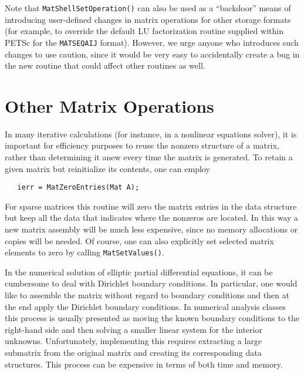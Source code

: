 Note that {\tt MatShellSetOperation()} can also be used as a
``backdoor'' means of introducing user-defined changes in matrix
operations for other storage formats (for example, to override the
default LU factorization routine supplied within PETSc for the
{\tt MATSEQAIJ} format).  However, we urge anyone who introduces such
changes to use caution, since it would be very easy to
accidentally create a bug in the new routine that could affect
other routines as well.

\section{Other Matrix Operations}
\label{sec:othermat}

In many iterative calculations (for instance, in a nonlinear equations
solver), it is important for efficiency purposes to reuse the nonzero 
structure of a matrix, rather than determining it anew every time 
the matrix is generated.  To retain a given matrix but reinitialize
its contents, one can employ 
\begin{verbatim}
   ierr = MatZeroEntries(Mat A);
\end{verbatim}
For sparse matrices this routine will zero the matrix entries in the 
data structure but keep all the data that indicates where the nonzeros
are located.  In this way a new matrix assembly will be much less 
expensive, since no memory allocations or copies will be needed. 
Of course, one can also explicitly set selected matrix elements to zero
by calling {\tt MatSetValues()}.


In the numerical solution of elliptic partial differential equations,
it can be cumbersome to deal with Dirichlet boundary 
 conditions. In
particular, one would like to assemble the matrix without regard to 
boundary conditions and then at the end apply the Dirichlet boundary 
conditions. 
In numerical analysis classes this process is usually presented as moving the 
known boundary conditions to the right-hand side and then solving a smaller
linear system for the interior unknowns. Unfortunately, implementing this
requires extracting a large submatrix from the original matrix and 
creating its corresponding data structures. This process can be expensive 
in terms of both time and memory. 


